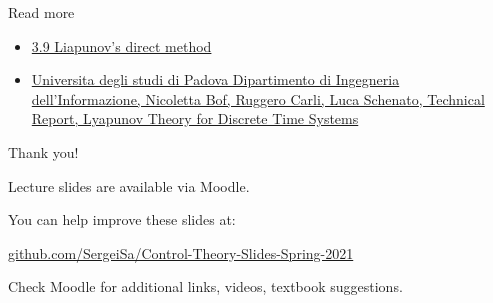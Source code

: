 \documentclass{beamer}
\begin{document}
\begin{frame}{Read more}
\begin{flushleft}

\begin{itemize}
    \item \href{https://folk.uib.no/nmagb/m2142002l3.pdf}{3.9 Liapunov’s direct method}
    \item \href{https://arxiv.org/abs/1809.05289}{Universita degli studi di Padova Dipartimento di Ingegneria dell'Informazione, Nicoletta Bof, Ruggero Carli, Luca Schenato, Technical Report, Lyapunov Theory for Discrete Time Systems}
\end{itemize}

\end{flushleft}
\end{frame}




\begin{frame}{Thank you!}
\centerline{Lecture slides are available via Moodle.}
\bigskip
\centerline{You can help improve these slides at:}
\centerline{\href{https://github.com/SergeiSa/Control-Theory-Slides-Spring-2021}{github.com/SergeiSa/Control-Theory-Slides-Spring-2021}}
\bigskip
\centerline{Check Moodle for additional links, videos, textbook suggestions.}
\end{frame}
\end{document}
